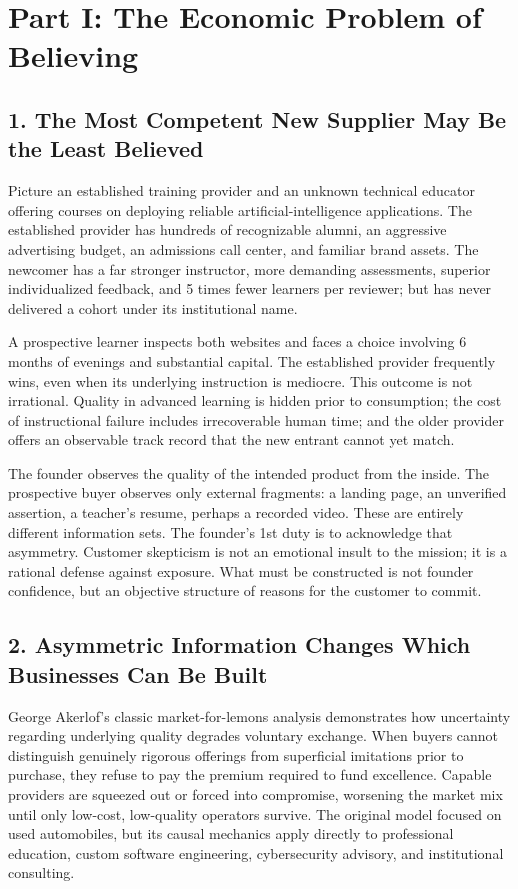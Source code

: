 \section*{Part I: The Economic Problem of Believing}

\subsection*{1. The Most Competent New Supplier May Be the Least Believed}

Picture an established training provider and an unknown technical educator offering courses on deploying reliable artificial-intelligence applications. The established provider has hundreds of recognizable alumni, an aggressive advertising budget, an admissions call center, and familiar brand assets. The newcomer has a far stronger instructor, more demanding assessments, superior individualized feedback, and 5 times fewer learners per reviewer; but has never delivered a cohort under its institutional name. 

A prospective learner inspects both websites and faces a choice involving 6 months of evenings and substantial capital. The established provider frequently wins, even when its underlying instruction is mediocre. This outcome is not irrational. Quality in advanced learning is hidden prior to consumption; the cost of instructional failure includes irrecoverable human time; and the older provider offers an observable track record that the new entrant cannot yet match.

The founder observes the quality of the intended product from the inside. The prospective buyer observes only external fragments: a landing page, an unverified assertion, a teacher's resume, perhaps a recorded video. These are entirely different information sets. The founder's 1st duty is to acknowledge that asymmetry. Customer skepticism is not an emotional insult to the mission; it is a rational defense against exposure. What must be constructed is not founder confidence, but an objective structure of reasons for the customer to commit.

\subsection*{2. Asymmetric Information Changes Which Businesses Can Be Built}

George Akerlof's classic market-for-lemons analysis demonstrates how uncertainty regarding underlying quality degrades voluntary exchange. When buyers cannot distinguish genuinely rigorous offerings from superficial imitations prior to purchase, they refuse to pay the premium required to fund excellence. Capable providers are squeezed out or forced into compromise, worsening the market mix until only low-cost, low-quality operators survive. The original model focused on used automobiles, but its causal mechanics apply directly to professional education, custom software engineering, cybersecurity advisory, and institutional consulting.

